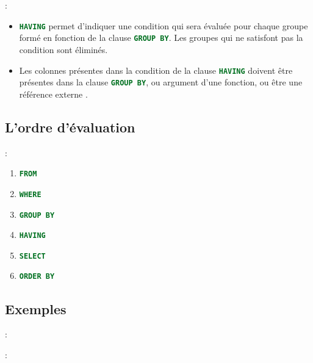 \documentclass[10pt]{beamer}
\begin{document}
\begin{frame}{\secname : \subsecname}
    \begin{itemize}
        \item \lstinline[language=sql]!HAVING! permet d'indiquer une condition qui sera évaluée pour chaque groupe formé en fonction de la clause \lstinline[language=sql]!GROUP BY!. Les groupes qui ne satisfont pas la condition sont éliminés.
        \item Les colonnes présentes dans la condition de la clause \lstinline[language=sql]!HAVING! doivent être présentes dans la clause \lstinline[language=sql]!GROUP BY!,  ou  argument d'une fonction,  ou être une référence externe .
    \end{itemize}
\end{frame}
\subsection{L'ordre d'évaluation}
\begin{frame}{\secname : \subsecname}
    \begin{enumerate}
        \item \lstinline[language=sql]!FROM!
        \item \lstinline[language=sql]!WHERE!
        \item \lstinline[language=sql]!GROUP BY!
        \item \lstinline[language=sql]!HAVING!
        \item \lstinline[language=sql]!SELECT!
        \item \lstinline[language=sql]!ORDER BY!
    \end{enumerate}
\end{frame}
\subsection{Exemples}
\begin{frame}{\secname : \subsecname}
    
\end{frame}

\begin{frame}{\secname : \subsecname}
    
\end{frame}
\end{document}
